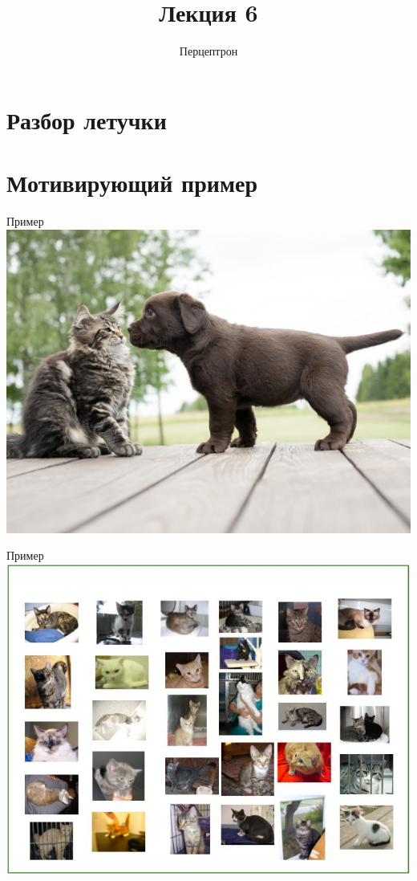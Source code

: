 \documentclass[10pt]{beamer}
\title{Лекция 6}
\subtitle{Перцептрон}
\begin{document}
\maketitle

\section{Разбор летучки}

\section{Мотивирующий пример}

{
\begin{frame}{Пример}
  \centering
  \includegraphics[width=0.9 \textwidth, keepaspectratio]{images/catvsdog}
\end{frame}
}

{
\begin{frame}{Пример}
  \centering
  \includegraphics[width=0.9 \textwidth, keepaspectratio]{images/cats}
\end{frame}
}
\end{document}
